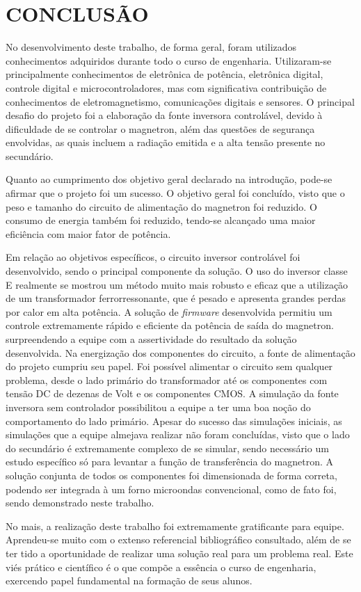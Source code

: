 \chapter{CONCLUSÃO}
\label{chap:conclusao}


No desenvolvimento deste trabalho, de forma geral, foram utilizados conhecimentos adquiridos durante todo o curso de engenharia. Utilizaram-se principalmente conhecimentos de eletrônica de potência, eletrônica digital, controle digital e microcontroladores, mas com significativa contribuição de conhecimentos de eletromagnetismo, comunicações digitais e  sensores. O principal desafio do projeto foi a elaboração da fonte inversora controlável, devido à dificuldade de se controlar o magnetron, além das questões de segurança envolvidas, as quais incluem a radiação emitida e a alta tensão presente no secundário.

Quanto ao cumprimento dos objetivo geral declarado na introdução, pode-se afirmar que o projeto foi um sucesso. O objetivo geral foi concluído, visto que o peso e tamanho do circuito de alimentação do magnetron foi reduzido. O consumo de energia também foi reduzido, tendo-se alcançado uma maior eficiência com maior fator de potência. 

Em relação ao objetivos específicos, o circuito inversor controlável foi desenvolvido, sendo o principal componente da solução. O uso do inversor classe E realmente se mostrou um método muito mais robusto e eficaz que a utilização de um transformador ferrorressonante, que é pesado e apresenta grandes perdas por calor em alta potência. A solução de \textit{firmware} desenvolvida  permitiu um controle extremamente rápido e eficiente da potência de saída do magnetron. surpreendendo a equipe com a assertividade do resultado da solução desenvolvida. Na energização dos componentes do circuito, a fonte de alimentação do projeto cumpriu seu papel. Foi possível alimentar o circuito sem qualquer problema, desde o lado primário do transformador até os componentes com tensão DC de dezenas de Volt e os componentes CMOS. A simulação da fonte inversora sem controlador possibilitou a equipe a ter uma boa noção do comportamento do lado primário. Apesar do sucesso das simulações iniciais, as simulações que a equipe almejava realizar não foram concluídas, visto que o lado do secundário é extremamente complexo de se simular, sendo necessário um estudo específico só para levantar a função de transferência do magnetron. A solução conjunta de todos os componentes foi dimensionada de forma correta, podendo ser integrada à um forno microondas convencional, como de fato foi, sendo demonstrado neste trabalho.

No mais, a realização deste trabalho foi extremamente gratificante para equipe. Aprendeu-se muito com o extenso referencial bibliográfico consultado, além de se ter tido a oportunidade de realizar uma solução real para um problema real. Este viés prático e científico é o que compõe a essência o curso de engenharia, exercendo papel fundamental na formação de seus alunos.